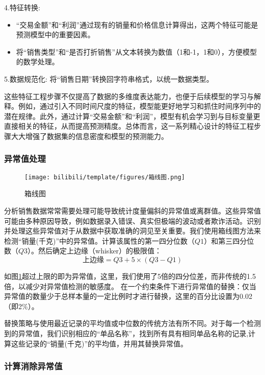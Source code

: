 \documentclass[withoutpreface,bwprint]{cumcmthesis} %
\begin{document}
4.特征转换:
\begin{itemize}
    \item  “交易金额”和“利润”通过现有的销量和价格信息计算得出，这两个特征可能是预测模型中的重要因素。
    \item  将“销售类型”和“是否打折销售”从文本转换为数值（1和-1，1和0），方便模型的数学处理。
\end{itemize}

5.数据规范化: 将“销售日期”转换回字符串格式，以统一数据类型。

这些特征工程步骤不仅提高了数据的多维度表达能力，也便于后续模型的学习与解释。例如，通过引入不同时间尺度的特征，模型能更好地学习和抓住时间序列中的潜在规律。此外，通过计算“交易金额”和“利润”，模型有机会学习到与目标变量更直接相关的特征，从而提高预测精度。总体而言，这一系列精心设计的特征工程步骤大大增强了数据集的信息密度和模型的预测能力。

\subsubsection{异常值处理}
\begin{figure}[H]%
	\centering
	\texttt{[image: bilibili/template/figures/箱线图.png]}%
    \caption{箱线图}
    \label{箱线图}%
\end{figure}
分析销售数据常常需要处理可能导致统计度量偏斜的异常值或离群值。这些异常值可能由多种原因导致，例如数据录入错误、真实但极端的波动或者欺诈活动。识别并处理这些异常值对于从数据中获取准确的洞见至关重要。我们使用箱线图方法来检测“销量(千克)”中的异常值。计算该属性的第一四分位数（\( Q1 \)）和第三四分位数（\( Q3 \)）。然后确定上边缘（whisker）的极限值：
\[
\text{上边缘} = Q3 + 5 \times (Q3 - Q1)
\]
    
    如图\ref{箱线图}超过上限的即为异常值，这里，我们使用了5倍的四分位差，而非传统的1.5倍，以减少对异常值检测的敏感度。
在一个约束条件下进行异常值的替换：仅当异常值的数量少于总样本量的一定比例时才进行替换，这里的百分比设置为0.02（即2\%）。

替换策略与使用最近记录的平均值或中位数的传统方法有所不同。对于每一个检测到的异常值，我们识别相应的“单品名称”，找到所有具有相同单品名称的记录,计算这些记录的“销量(千克)”的平均值，并用其替换异常值。

\subsubsection{计算消除异常值}
\end{document}
